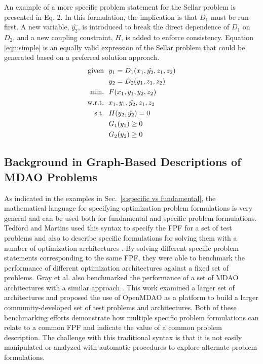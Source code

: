 An example of a more specific problem statement for the Sellar problem is presented in Eq. 2.  
In this formulation, the implication is that  $D_1$ must be run 
    first. A new variable, $\hat{y_2}$, is introduced to break the direct dependence of
    $D_1$ on $D_2$, and a new coupling constraint, $H$, is added to enforce 
    consistency. Equation \ref{eqn:simple} is 
    an equally valid expression of the Sellar problem that could be 
    generated  based on a preferred solution approach.
    \begin{align}
        \textrm{given} & \ \ y_1 = D_1(x_1,\hat{y_2},z_1,z_2) \notag
        \\      & \ \ y_2 = D_2(y_1,z_1,z_2) \notag
        \\\textrm{min.} &\ \ F(x_1,y_1,y_2,z_2) \notag
        \\\textrm{w.r.t.} & \ \ x_1,y_1,\hat{y_2},z_1,z_2 \notag
        \\\textrm{s.t.} & \ \ H(y_2,\hat{y_2}) = 0 \notag 
        \\     & \ \ G_1(y_1) \geq 0 \notag
        \\     & \ \ G_2(y_2) \geq 0
        \label{eqn:simple}
    \end{align}
\subsection{Background in Graph-Based Descriptions of MDAO Problems}
	\label{s:existing syntax}
    As indicated in the examples in Sec.~\ref{s:specific vs fundamental}, the mathematical 
    language for specifying optimization problem formulations is very general and can be used both for 
    fundamental and specific problem formulations. Tedford and Martins used this syntax to specify the 
    FPF for a set of test problems and also to describe specific formulations for solving them with a 
    number of optimization architectures \cite{Tedford2009}. By solving different specific problem statements corresponding to the same FPF, they were able to  benchmark the performance of different optimization architectures against a fixed set of 
    problems. Gray et al. also benchmarked the performance of a set of MDAO architectures  with a similar approach \cite{Gray2013}. 
    This work examined a larger set of architectures and proposed the use of OpenMDAO as a platform to build a larger community-developed set of test problems and architectures. Both of these benchmarking efforts 
    demonstrate how multiple specific problem formulations can relate to a common FPF and indicate the 
    value of a common problem description. The challenge with this 
    traditional syntax is that it is not easily manipulated or analyzed with automatic procedures to explore alternate problem formulations. 

